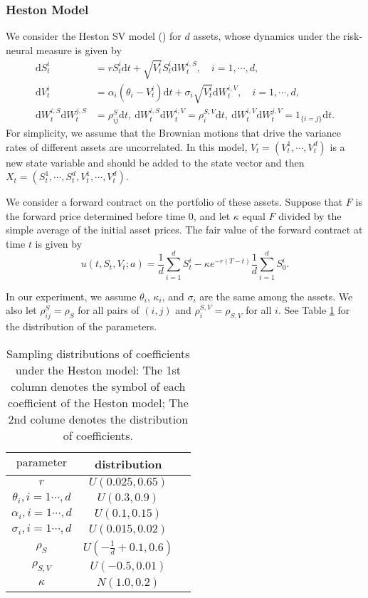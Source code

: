 \documentclass[11pt,a4paper]{article}
\theoremstyle{remark}
\begin{document}
  \subsubsection{Heston Model}
  We consider the Heston SV model (\cite{heston1993closed}) for $d$ assets, whose dynamics under the risk-neural measure is given by
  \begin{align}
  	\mathrm{d} S_t^i & = r S_t^i \mathrm{d} t + \sqrt{V^i_t} S_t^i\mathrm{d} W_t^{i,S},\quad i=1,\cdots,d, \\
  	\mathrm{d} V_t^i & = \alpha_i (\theta_i -  V_t^i) \mathrm{d} t + \sigma_i \sqrt{V_t^i}\mathrm{d} W_t^{i,V},\quad i=1,\cdots,d, \\
  	\mathrm{d}W^{i,S}_t\mathrm{d}W^{j,S}_t &= \rho^{S}_{ij} \mathrm{d}t,\  \mathrm{d}W^{i,S}_t\mathrm{d}W^{i,V}_t = \rho^{S,V}_i \mathrm{d}t,\ \mathrm{d}W^{i,V}_t\mathrm{d}W^{j,V}_t = 1_{\{i=j\}}\mathrm{d}t. 
  \end{align}
  For simplicity, we assume that the Brownian motions that drive the variance rates of different assets are uncorrelated. In this model, $V_t=(V^1_t,\cdots,V^d_t)$ is a new state variable and should be added to the state vector and then $X_t = (S^1_t,\cdots,S^d_t, V^1_t,\cdots,V^d_t)$.
  
  We consider a forward contract on the portfolio of these  assets. Suppose that $F$ is the forward price determined before time $0$, and let $\kappa$ equal $F$ divided by the simple average of the initial asset prices. The fair value of the forward contract at time $t$ is given by 
  \begin{equation}
  	u(t, S_t, V_t; a) = \frac{1}{d}\sum_{i=1}^d S^i_t - \kappa e^{-r(T-t)}\frac{1}{d}\sum_{i=1}^d S^i_0.
  \end{equation}
  
  In our experiment, we assume $\theta_i$, $\kappa_i$, and $\sigma_i$ are the same among the assets. We also let $\rho^S_{ij}=\rho_S$ for all pairs of $(i,j)$ and $\rho_i^{S,V}=\rho_{S,V}$ for all $i$. See Table \ref{tab:dist-Heston} for the distribution of the parameters.
  
  \begin{table}[htbp!]
  	\centering
  	\begin{tabular}{ccc}
  		\hline
  		$\text{parameter}$    &   distribution  \\
  		\hline
  		$r$     &  $U(0.025, 0.65)$\\
  		$\theta_i, i=1\cdots,d$   & $U(0.3, 0.9)$\\
  		$\alpha_i, i=1\cdots,d$   & $U(0.1, 0.15)$\\
  		$\sigma_i, i=1\cdots,d$   & $U(0.015, 0.02)$\\
  		$\rho_S$  & $U(-\frac{1}{d}+0.1, 0.6)$  \\
  		$\rho_{S,V}$   & $U(-0.5, 0.01)$ \\
  		$\kappa$ & $N(1.0, 0.2)$ \\
  		\hline
  	\end{tabular}%
  	\caption{Sampling distributions of coefficients under the Heston model: The 1st column denotes the symbol of each coefficient of the Heston model; The 2nd colume denotes the distribution of coefficients.}
  	\label{tab:dist-Heston}%
  \end{table}%
	
\end{document}
